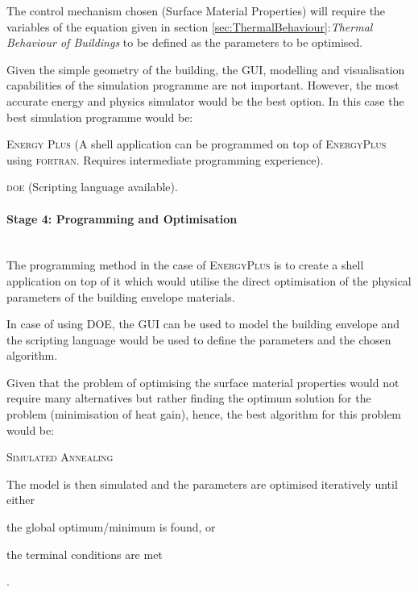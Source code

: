 The control mechanism chosen (Surface Material Properties) will require the variables of the equation given in section \ref{sec:ThermalBehaviour}:\emph{Thermal Behaviour of Buildings} to be defined as the parameters to be optimised.

Given the simple geometry of the building, the GUI, modelling and  visualisation capabilities of the simulation programme are not important. However, the most accurate energy and physics simulator would be the best option. In this case the best simulation programme would be:

\begin{compactenum}
	\item \textsc{Energy Plus} (A shell application can be programmed on top of \textsc{EnergyPlus} using \textsc{fortran}. Requires intermediate programming experience).
	\item \textsc{doe} (Scripting language available).
\end{compactenum}

\paragraph{Stage 4: Programming and Optimisation}\mbox{}\\

The programming method in the case of \textsc{EnergyPlus} is to create a shell application on top of it which would utilise the direct optimisation of the physical parameters of the building envelope materials.

In case of using \textsc{DOE}, the GUI can be used to model the building envelope and the scripting language would be used to define the parameters and the chosen algorithm.

Given that the problem of optimising the surface material properties would not require many alternatives but rather finding the optimum solution for the problem (minimisation of heat gain), hence, the best algorithm for this problem would be:

\begin{compactenum}
\item \textsc{Simulated Annealing}
\end{compactenum}

The model is then simulated and the parameters are optimised iteratively until either \begin{inparaenum}[a)]\item the global optimum/minimum is found, or \item the terminal conditions are met\end{inparaenum}.

